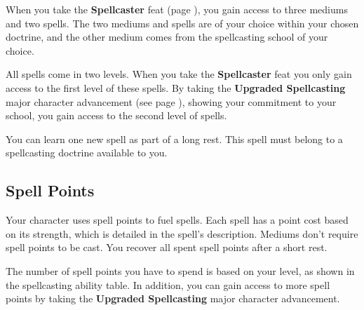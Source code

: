    When you take the \textbf{Spellcaster} feat (page \pageref{feat::spellcaster}), you gain access to three mediums and two spells.
    The two mediums and spells are of your choice within your chosen doctrine, and the other medium comes from the spellcasting school of your choice.

    All spells come in two levels.
    When you take the \textbf{Spellcaster} feat you only gain access to the first level of these spells.
    By taking the \textbf{Upgraded Spellcasting} major character advancement (see page \pageref{mca::upgradedspellcasting}), showing your commitment to your school, you gain access to the second level of spells.

    You can learn one new spell as part of a long rest.
    This spell must belong to a spellcasting doctrine available to you.

\pagebreak
\subsection*{Spell Points}
    Your character uses spell points to fuel spells.
    Each spell has a point cost based on its strength, which is detailed in the spell's description.
    Mediums don't require spell points to be cast.
    You recover all spent spell points after a short rest.

    The number of spell points you have to spend is based on your level, as shown in the spellcasting ability table.
    In addition, you can gain access to more spell points by taking the \textbf{Upgraded Spellcasting} major character advancement.

    \thispagestyle{empty} %

